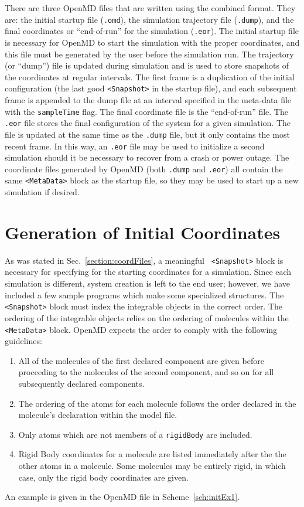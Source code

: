 \documentclass[letterpaper]{report}
\begin{document}
There are three OpenMD files that are written using the combined
format.  They are: the initial startup file (\texttt{.omd}), the
simulation trajectory file (\texttt{.dump}), and the final coordinates
or ``end-of-run'' for the simulation (\texttt{.eor}). The initial
startup file is necessary for OpenMD to start the simulation with
the proper coordinates, and this file must be generated by the user
before the simulation run. The trajectory (or ``dump'') file is
updated during simulation and is used to store snapshots of the
coordinates at regular intervals. The first frame is a duplication of
the initial configuration (the last good {\tt <Snapshot>} in the
startup file), and each subsequent frame is appended to the dump file
at an interval specified in the meta-data file with the
\texttt{sampleTime} flag. The final coordinate file is the
``end-of-run'' file.  The \texttt{.eor} file stores the final
configuration of the system for a given simulation. The file is
updated at the same time as the \texttt{.dump} file, but it only
contains the most recent frame. In this way, an \texttt{.eor} file may
be used to initialize a second simulation should it be necessary to
recover from a crash or power outage. The coordinate files generated
by OpenMD (both \texttt{.dump} and \texttt{.eor}) all contain the
same {\tt <MetaData>} block as the startup file, so they may be
used to start up a new simulation if desired.

\section{\label{section:initCoords}Generation of Initial Coordinates}

As was stated in Sec.~\ref{section:coordFiles}, a meaningful {\tt
<Snapshot>} block is necessary for specifying for the starting
coordinates for a simulation.  Since each simulation is different,
system creation is left to the end user; however, we have included a
few sample programs which make some specialized structures.  The {\tt
<Snapshot>} block must index the integrable objects in the correct
order.  The ordering of the integrable objects relies on the ordering
of molecules within the {\tt <MetaData>} block. OpenMD
expects the order to comply with the following guidelines:
\begin{enumerate}
\item All of the molecules of the first declared component are given
before proceeding to the molecules of the second component, and so on
for all subsequently declared components.
\item The ordering of the atoms for each molecule follows the order
declared in the molecule's declaration within the model file.
\item Only atoms which are not members of a {\tt rigidBody} are
included.
\item Rigid Body coordinates for a molecule are listed immediately
after the the other atoms in a molecule.  Some molecules may be
entirely rigid, in which case, only the rigid body coordinates are
given.
\end{enumerate}
An example is given in the OpenMD file in Scheme~\ref{sch:initEx1}.
\end{document}
